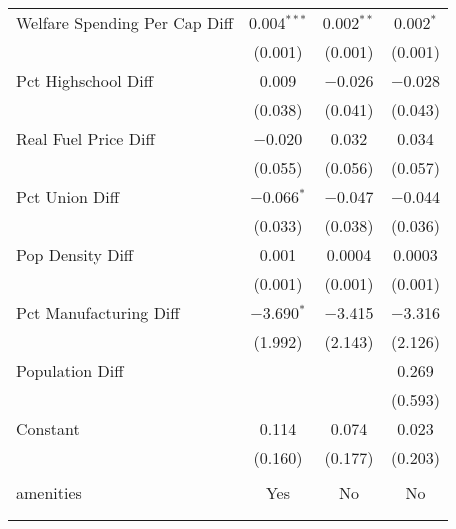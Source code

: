 \begin{table}[!htbp]
\begin{tabular}{@{\extracolsep{5pt}}lccc}
  Welfare Spending Per Cap Diff & 0.004$^{***}$ & 0.002$^{**}$ & 0.002$^{*}$ \\ 
  & (0.001) & (0.001) & (0.001) \\ 
  Pct Highschool Diff & 0.009 & $-$0.026 & $-$0.028 \\ 
  & (0.038) & (0.041) & (0.043) \\ 
  Real Fuel Price Diff & $-$0.020 & 0.032 & 0.034 \\ 
  & (0.055) & (0.056) & (0.057) \\ 
  Pct Union Diff & $-$0.066$^{*}$ & $-$0.047 & $-$0.044 \\ 
  & (0.033) & (0.038) & (0.036) \\ 
  Pop Density Diff & 0.001 & 0.0004 & 0.0003 \\ 
  & (0.001) & (0.001) & (0.001) \\ 
  Pct Manufacturing Diff & $-$3.690$^{*}$ & $-$3.415 & $-$3.316 \\ 
  & (1.992) & (2.143) & (2.126) \\ 
  Population Diff &  &  & 0.269 \\ 
  &  &  & (0.593) \\ 
  Constant & 0.114 & 0.074 & 0.023 \\ 
  & (0.160) & (0.177) & (0.203) \\ 
 \hline \\[-1.8ex] 
amenities & Yes & No & No \\ 
\hline \\[-1.8ex] 
\hline 
\hline \\[-1.8ex] 
\end{tabular} 
\end{table} 
